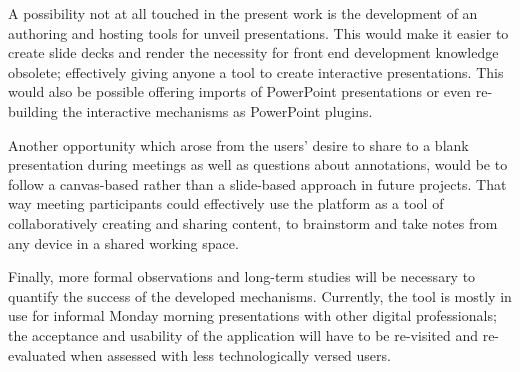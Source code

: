 A possibility not at all touched in the present work is the development of an authoring and hosting tools for unveil presentations. This would make it easier to create slide decks and render the necessity for front end development knowledge obsolete; effectively giving anyone a tool to create interactive presentations. This would also be possible offering imports of PowerPoint presentations or even re-building the interactive mechanisms as PowerPoint plugins.

Another opportunity which arose from the users' desire to share to a blank presentation during meetings as well as questions about annotations, would be to follow a canvas-based rather than a slide-based approach in future projects. That way meeting participants could effectively use the platform as a tool of collaboratively creating and sharing content, to brainstorm and take notes from any device in a shared working space.

Finally, more formal observations and long-term studies will be necessary to quantify the success of the developed mechanisms. Currently, the tool is mostly in use for informal Monday morning presentations with other digital professionals; the acceptance and usability of the application will have to be re-visited and re-evaluated when assessed with less technologically versed users.